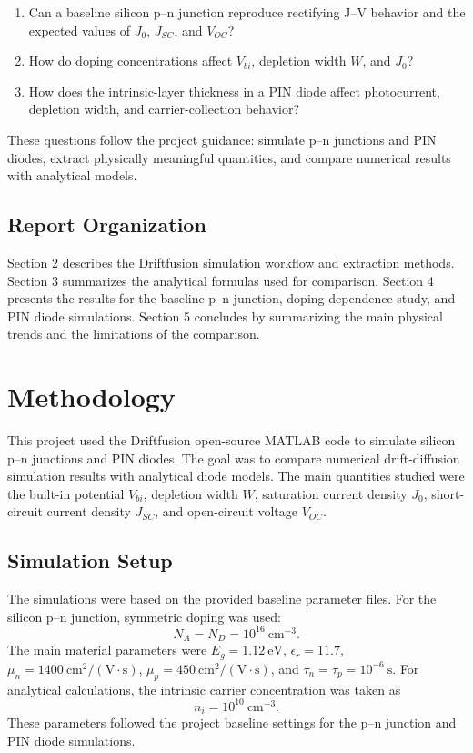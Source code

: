 \documentclass[11pt,a4paper]{article}
\newcommand{\jzero}{J_0}
\newcommand{\jsc}{J_{SC}}
\newcommand{\voc}{V_{OC}}
\newcommand{\vbi}{V_{bi}}
\begin{document}
\begin{enumerate}[leftmargin=2em]
    \item Can a baseline silicon p--n junction reproduce rectifying J--V behavior and the expected values of $\jzero$, $\jsc$, and $\voc$?
    \item How do doping concentrations affect $\vbi$, depletion width $W$, and $\jzero$?
    \item How does the intrinsic-layer thickness in a PIN diode affect photocurrent, depletion width, and carrier-collection behavior?
\end{enumerate}

These questions follow the project guidance: simulate p--n junctions and PIN diodes, extract physically meaningful quantities, and compare numerical results with analytical models.

\subsection{Report Organization}

Section 2 describes the Driftfusion simulation workflow and extraction methods. Section 3 summarizes the analytical formulas used for comparison. Section 4 presents the results for the baseline p--n junction, doping-dependence study, and PIN diode simulations. Section 5 concludes by summarizing the main physical trends and the limitations of the comparison.

\section{Methodology}

This project used the Driftfusion open-source MATLAB code to simulate silicon p--n junctions and PIN diodes. The goal was to compare numerical drift-diffusion simulation results with analytical diode models. The main quantities studied were the built-in potential $V_{bi}$, depletion width $W$, saturation current density $J_0$, short-circuit current density $J_{SC}$, and open-circuit voltage $V_{OC}$.

\subsection{Simulation Setup}

The simulations were based on the provided baseline parameter files. For the silicon p--n junction, symmetric doping was used:
\[
N_A = N_D = 10^{16}\ \mathrm{cm^{-3}}.
\]
The main material parameters were $E_g = 1.12\ \mathrm{eV}$, $\epsilon_r = 11.7$, $\mu_n = 1400\ \mathrm{cm^2/(V\cdot s)}$, $\mu_p = 450\ \mathrm{cm^2/(V\cdot s)}$, and $\tau_n = \tau_p = 10^{-6}\ \mathrm{s}$. For analytical calculations, the intrinsic carrier concentration was taken as
\[
n_i = 10^{10}\ \mathrm{cm^{-3}}.
\]
These parameters followed the project baseline settings for the p--n junction and PIN diode simulations.
\end{document}
